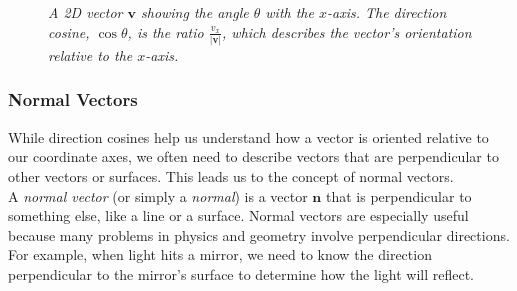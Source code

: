 \begin{figure}[H]
    \centering
    \caption{\textit{A 2D vector \( \mathbf{v} \) showing the angle \( \theta \) with the \( x \)-axis. The direction cosine, \( \cos \theta \), is the ratio \( \frac{v_x}{|\mathbf{v}|} \), which describes the vector’s orientation relative to the \( x \)-axis.}}
    \label{fig:direction_cosines}
\end{figure}


\subsubsection*{Normal Vectors}

\noindent While direction cosines help us understand how a vector is oriented relative to our coordinate axes, we often need to describe vectors that are perpendicular to other vectors or surfaces. This leads us to the concept of normal vectors. \\

\noindent A \textit{normal vector} (or simply a \textit{normal}) is a vector $\mathbf{n}$ that is perpendicular to something else, like a line or a surface. Normal vectors are especially useful because many problems in physics and geometry involve perpendicular directions. For example, when light hits a mirror, we need to know the direction perpendicular to the mirror's surface to determine how the light will reflect. \\

